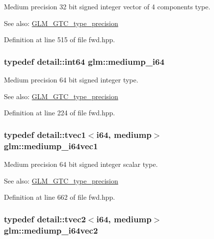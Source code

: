 Medium precision 32 bit signed integer vector of 4 components type. \begin{Desc}
\item[See also:]\hyperlink{group__gtc__type__precision}{GLM\_\-GTC\_\-type\_\-precision} \end{Desc}


Definition at line 515 of file fwd.hpp.\hypertarget{group__gtc__type__precision_g90fedf6c701ffbe00535156715e50787}{
\subsubsection[mediump\_\-i64]{\setlength{\rightskip}{0pt plus 5cm}typedef detail::int64 {\bf glm::mediump\_\-i64}}}
\label{group__gtc__type__precision_g90fedf6c701ffbe00535156715e50787}


Medium precision 64 bit signed integer type. \begin{Desc}
\item[See also:]\hyperlink{group__gtc__type__precision}{GLM\_\-GTC\_\-type\_\-precision} \end{Desc}


Definition at line 224 of file fwd.hpp.\hypertarget{group__gtc__type__precision_gd2423a91c791b9ca2f8a3ecfc71b080d}{
\subsubsection[mediump\_\-i64vec1]{\setlength{\rightskip}{0pt plus 5cm}typedef detail::tvec1$<$i64, mediump$>$ {\bf glm::mediump\_\-i64vec1}}}
\label{group__gtc__type__precision_gd2423a91c791b9ca2f8a3ecfc71b080d}


Medium precision 64 bit signed integer scalar type. \begin{Desc}
\item[See also:]\hyperlink{group__gtc__type__precision}{GLM\_\-GTC\_\-type\_\-precision} \end{Desc}


Definition at line 662 of file fwd.hpp.\hypertarget{group__gtc__type__precision_g5cf0bec13b01b6124e966360cffe15a4}{
\subsubsection[mediump\_\-i64vec2]{\setlength{\rightskip}{0pt plus 5cm}typedef detail::tvec2$<$i64, mediump$>$ {\bf glm::mediump\_\-i64vec2}}}
\label{group__gtc__type__precision_g5cf0bec13b01b6124e966360cffe15a4}


